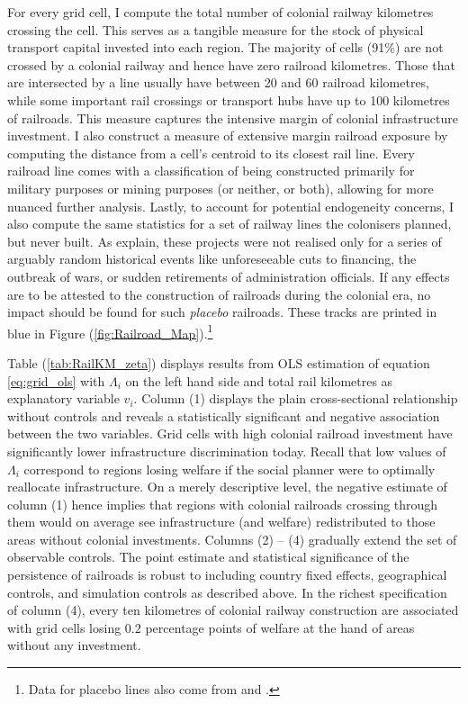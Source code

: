 \documentclass[11pt, oneside]{article}   	%
\let\oldref\ref
\renewcommand{\ref}[1]{(\oldref{#1})}
\begin{document}
For every grid cell, I compute the total number of colonial railway kilometres crossing the cell. This serves as a tangible measure for the stock of physical transport capital invested into each region. The majority of cells (91\%) are not crossed by a colonial railway and hence have zero railroad kilometres. Those that are intersected by a line usually have between 20 and 60 railroad kilometres, while some important rail crossings or transport hubs have up to 100 kilometres of railroads. This measure captures the intensive margin of colonial infrastructure investment. I also construct a measure of extensive margin railroad exposure by computing the distance from a cell's centroid to its closest rail line. Every railroad line comes with a classification of being constructed primarily for military purposes or mining purposes (or neither, or both), allowing for more nuanced further analysis. Lastly, to account for potential endogeneity concerns, I also compute the same statistics for a set of railway lines the colonisers planned, but never built. As \cite{Jedwab_PermanentEffectsTransportation_2016a} explain, these projects were not realised only for a series of arguably random historical events like unforeseeable cuts to financing, the outbreak of wars, or sudden retirements of administration officials. If any effects are to be attested to the construction of railroads during the colonial era, no impact should be found for such \emph{placebo} railroads. These tracks are printed in blue in Figure \ref{fig:Railroad_Map}.\footnote{Data for placebo lines also come from \cite{Jedwab_PermanentEffectsTransportation_2016a} and \cite{Herranz-Loncan_publicbenefitRailways_2017}.}

Table \ref{tab:RailKM_zeta} displays results from OLS estimation of equation \eqref{eq:grid_ols} with $\Lambda_{i}$ on the left hand side and total rail kilometres as explanatory variable $v_{i}$. Column (1) displays the plain cross-sectional relationship without controls and reveals a statistically significant and negative association between the two variables. Grid cells with high colonial railroad investment have significantly lower infrastructure discrimination today. Recall that low values of $\Lambda_{i}$ correspond to regions losing welfare if the social planner were to optimally reallocate infrastructure. On a merely descriptive level, the negative estimate of column (1) hence implies that regions with colonial railroads crossing through them would on average see infrastructure (and welfare) redistributed to those areas without colonial investments. Columns (2) -- (4) gradually extend the set of observable controls. The point estimate and statistical significance of the persistence of railroads is robust to including country fixed effects, geographical controls, and simulation controls as described above. In the richest specification of column (4), every ten kilometres of colonial railway construction are associated with grid cells losing $0.2$ percentage points of welfare at the hand of areas without any investment.
\end{document}
